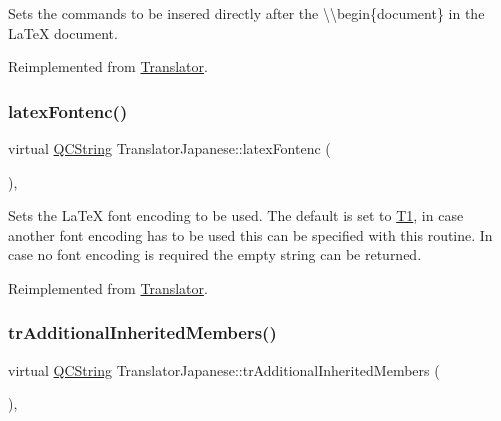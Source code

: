 Sets the commands to be insered directly after the {\ttfamily \textbackslash{}\textbackslash{}begin\{document\}} in the La\+TeX document. 

Reimplemented from \mbox{\hyperlink{class_translator_a9fe33a516bc0ec6825a967294dd5d686}{Translator}}.

\mbox{\label{class_translator_japanese_aff9e398a5bba5fa1e345ffba08964466}} 
\subsubsection{\texorpdfstring{latexFontenc()}{latexFontenc()}}
{\footnotesize\ttfamily virtual \mbox{\hyperlink{class_q_c_string}{Q\+C\+String}} Translator\+Japanese\+::latex\+Fontenc (\begin{DoxyParamCaption}{ }\end{DoxyParamCaption})\hspace{0.3cm}{\ttfamily [inline]}, {\ttfamily [virtual]}}

Sets the La\+TeX font encoding to be used. The default is set to {\ttfamily \mbox{\hyperlink{class_t1}{T1}}}, in case another font encoding has to be used this can be specified with this routine. In case no font encoding is required the empty string can be returned. 

Reimplemented from \mbox{\hyperlink{class_translator_a573b483369d8d7cf7d85831a9da356be}{Translator}}.

\mbox{\label{class_translator_japanese_a13b991d50c189d057a8fdb99763b8f98}} 
\subsubsection{\texorpdfstring{trAdditionalInheritedMembers()}{trAdditionalInheritedMembers()}}
{\footnotesize\ttfamily virtual \mbox{\hyperlink{class_q_c_string}{Q\+C\+String}} Translator\+Japanese\+::tr\+Additional\+Inherited\+Members (\begin{DoxyParamCaption}{ }\end{DoxyParamCaption})\hspace{0.3cm}{\ttfamily [inline]}, {\ttfamily [virtual]}}

